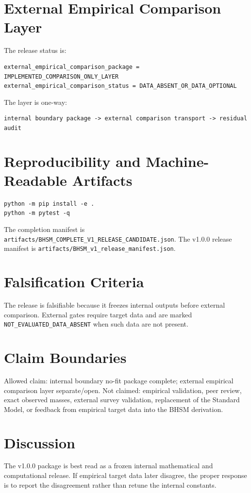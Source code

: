 \documentclass[11pt]{article}
\begin{document}
\section{External Empirical Comparison Layer}
The release status is:
\begin{verbatim}
external_empirical_comparison_package = IMPLEMENTED_COMPARISON_ONLY_LAYER
external_empirical_comparison_status = DATA_ABSENT_OR_DATA_OPTIONAL
\end{verbatim}
The layer is one-way:
\begin{verbatim}
internal boundary package -> external comparison transport -> residual audit
\end{verbatim}

\section{Reproducibility and Machine-Readable Artifacts}
\begin{verbatim}
python -m pip install -e .
python -m pytest -q
\end{verbatim}
The completion manifest is \texttt{artifacts/BHSM\_COMPLETE\_V1\_RELEASE\_CANDIDATE.json}. The v1.0.0 release manifest is \texttt{artifacts/BHSM\_v1\_release\_manifest.json}.

\section{Falsification Criteria}
The release is falsifiable because it freezes internal outputs before external comparison. External gates require target data and are marked \texttt{NOT\_EVALUATED\_DATA\_ABSENT} when such data are not present.

\section{Claim Boundaries}
Allowed claim: internal boundary no-fit package complete; external empirical comparison layer separate/open.
Not claimed: empirical validation, peer review, exact observed masses, external survey validation, replacement of the Standard Model, or feedback from empirical target data into the BHSM derivation.

\section{Discussion}
The v1.0.0 package is best read as a frozen internal mathematical and computational release. If empirical target data later disagree, the proper response is to report the disagreement rather than retune the internal constants.
\end{document}
